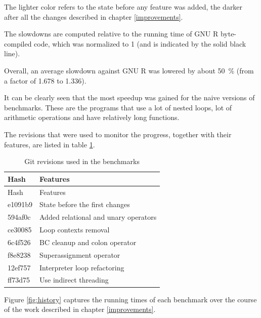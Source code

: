 The lighter color refers to the state before any feature was added, the darker after all the changes described in chapter \ref{improvements}.

The slowdowns are computed relative to the running time of GNU R byte-compiled code, which was normalized to 1 (and is indicated by the solid black line).

Overall, an average slowdown against GNU R was lowered by about 50~\% (from a factor of 1.678 to 1.336).

It can be clearly seen that the most speedup was gained for the naive versions of benchmarks. These are the programs that use a lot of nested loops, lot of arithmetic operations and have relatively long functions.


\todo[more]

The revisions that were used to monitor the progress, together with their features, are listed in table \ref{tab:git-rev}.

\begin{longtable}[c]{@{}ll@{}}
\caption{Git revisions used in the benchmarks\label{tab:git-rev}} \tabularnewline
\toprule
Hash & Features \tabularnewline
\midrule
\endfirsthead
\toprule
Hash & Features \tabularnewline
\midrule
\endhead
e1091b9 & State before the first changes \tabularnewline
594af0c & Added relational and unary operators \tabularnewline
ce30085 & Loop contexts removal \tabularnewline
6c4f526 & BC cleanup and colon operator \tabularnewline
f8e8238 & Superassignment operator \tabularnewline
12ef757 & Interpreter loop refactoring \tabularnewline
ff73d75 & Use indirect threading \tabularnewline
\bottomrule
\end{longtable}


Figure \ref{fig:history} captures the running times of each benchmark over the course of the work described in chapter \ref{improvements}.

